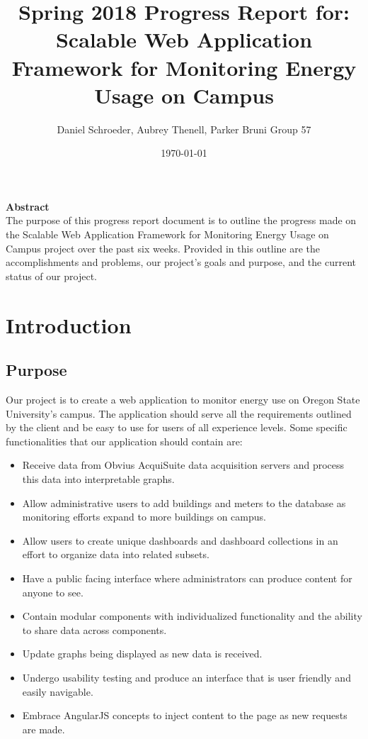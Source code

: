 \documentclass[letterpaper,10pt,serif,draftclsnofoot,onecolumn,compsoc,titlepage]{IEEEtran}
\title{Spring 2018 Progress Report for: \linebreak Scalable Web Application Framework for Monitoring Energy Usage on Campus}
\author{Daniel Schroeder, Aubrey Thenell, Parker Bruni \linebreak Group 57}
\date{\today}
\begin{document}
 \maketitle
 \vspace{2cm}

 \vspace{2cm}
 \begin{center}
 \noindent \textbf{Abstract} \\
			 \indent The purpose of this progress report document is to outline the progress made on the Scalable Web Application
Framework for Monitoring Energy Usage on Campus project over the past six weeks. Provided in this outline
are the accomplishments and problems, our project's goals and purpose, and the current status of our project.
 \end{center}         
 
 \newpage
\tableofcontents
\newpage

\section{Introduction}
\subsection{Purpose} 
    Our project is to create a web application to monitor energy use on Oregon State University's campus. The application should serve all the requirements outlined by the client and be easy to use for users of all experience levels.
    \noindent Some specific functionalities that our application should contain are:
    \begin{itemize}
        \item Receive data from Obvius AcquiSuite data acquisition servers and process this data into interpretable graphs.
        \item Allow administrative users to add buildings and meters to the database as monitoring efforts expand to more buildings on campus.
        \item Allow users to create unique dashboards and dashboard collections in an effort to organize data into related subsets.
        \item Have a public facing interface where administrators can produce content for anyone to see.
        \item Contain modular components with individualized functionality and the ability to share data across components.
        \item Update graphs being displayed as new data is received.
        \item Undergo usability testing and produce an interface that is user friendly and easily navigable.
        \item Embrace AngularJS concepts to inject content to the page as new requests are made.
    \end{itemize}
\end{document}
